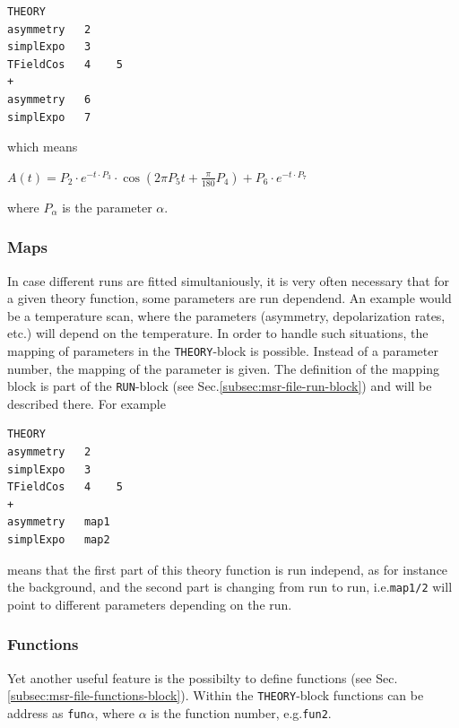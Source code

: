 \documentclass[twoside]{article}
\begin{document}
\begin{verbatim}
THEORY
asymmetry   2
simplExpo   3
TFieldCos   4    5
+
asymmetry   6
simplExpo   7
\end{verbatim}

\noindent which means

\begin{math}
 A(t) = P_2 \cdot e^{-t\cdot P_3} \cdot \cos(2\pi P_5 t + \frac{\displaystyle\pi}{180} P_4) +
        P_6 \cdot e^{-t\cdot P_7}
\end{math}

\noindent where $P_\alpha$ is the parameter $\alpha$.

\subsubsection{Maps}\label{subsubsec:maps}%

In case different runs are fitted simultaniously, it is very often necessary that for a given theory function, some parameters are run dependend. An example would be a temperature scan, where the parameters (asymmetry, depolarization rates, etc.\xspace) will depend on the temperature. In order to handle such situations, the mapping of parameters in the \texttt{THEORY}-block is possible. Instead of a parameter number, the mapping of the parameter is given. The definition of the mapping block is part of the \texttt{RUN}-block (see Sec.\ref{subsec:msr-file-run-block}) and will be described there. For example

\begin{verbatim}
THEORY
asymmetry   2
simplExpo   3
TFieldCos   4    5
+
asymmetry   map1
simplExpo   map2
\end{verbatim}

\noindent means that the first part of this theory function is run independ, as for instance the background, and the second part is changing from run to run, i.e.\xspace \texttt{map1/2} will point to different parameters depending on the run.

\subsubsection{Functions}\label{subsubsec:functions}%

Yet another useful feature is the possibilty to define functions (see Sec.\ref{subsec:msr-file-functions-block}). Within the \texttt{THEORY}-block functions can be address as \texttt{fun$\alpha$}, where $\alpha$ is the function number, e.g.\xspace \texttt{fun2}.
\end{document}
